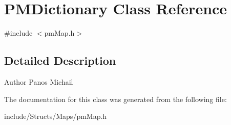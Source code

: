 \hypertarget{class_p_m_dictionary}{
\section{PMDictionary Class Reference}
\label{class_p_m_dictionary}
}


{\ttfamily \#include $<$pmMap.h$>$}



\subsection{Detailed Description}
\begin{DoxyAuthor}{Author}
Panos Michail 
\end{DoxyAuthor}


The documentation for this class was generated from the following file:\begin{DoxyCompactItemize}
\item 
include/Structs/Maps/pmMap.h\end{DoxyCompactItemize}
